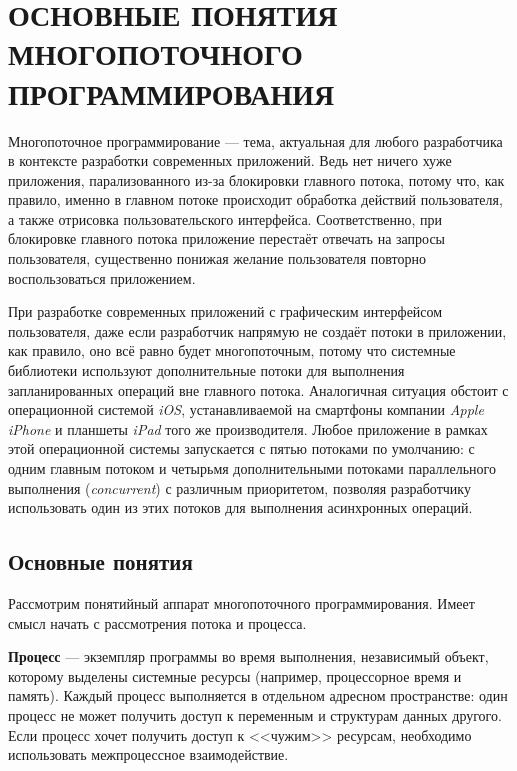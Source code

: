 \section[Основные понятия многопоточного программирования]
{ОСНОВНЫЕ ПОНЯТИЯ МНОГОПОТОЧНОГО \\ ПРОГРАММИРОВАНИЯ}

Многопоточное программирование --- тема, актуальная для любого разработчика в
контексте разработки современных приложений. Ведь нет ничего хуже приложения,
парализованного из-за блокировки главного потока, потому что, как правило,
именно в главном потоке происходит обработка действий пользователя, а также
отрисовка пользовательского интерфейса. Соответственно, при блокировке
главного потока приложение перестаёт отвечать на запросы пользователя,
существенно понижая желание пользователя повторно воспользоваться приложением.

При разработке современных приложений с графическим интерфейсом пользователя,
даже если разработчик напрямую не создаёт потоки в приложении, как правило,
оно всё равно будет многопоточным, потому что системные библиотеки используют
дополнительные потоки для выполнения запланированных операций вне главного потока.
Аналогичная ситуация обстоит с операционной системой \textit{iOS}, устанавливаемой
на смартфоны компании \textit{Apple iPhone} и планшеты \textit{iPad} того же производителя.
Любое приложение в рамках этой операционной системы запускается с пятью потоками
по умолчанию: с одним главным потоком и четырьмя дополнительными потоками
параллельного выполнения (\textit{concurrent}) с различным приоритетом, позволяя
разработчику использовать один из этих потоков для выполнения асинхронных
операций.

\subsection{Основные понятия}

Рассмотрим понятийный аппарат многопоточного программирования.
Имеет смысл начать с рассмотрения потока и процесса.

\textbf{Процесс} --- экземпляр программы во время выполнения, независимый объект,
которому выделены системные ресурсы (например, процессорное время и память).
Каждый процесс выполняется в отдельном адресном пространстве: один процесс
не может получить доступ к переменным и структурам данных другого.
Если процесс хочет получить доступ к <<чужим>> ресурсам,
необходимо использовать межпроцессное взаимодействие.

